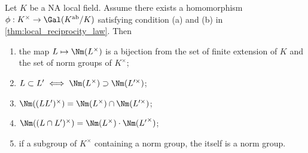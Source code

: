   \begin{corollary}\label{cor:correspondence_between_extensions_and_norm_groups}
      Let $K$ be a NA local field.
      Assume there exists a homomorphism $\phi: K^\times \to \Gal(K^\ab / K)$ satisfying condition (a) and (b) in \cref{thm:local_reciprocity_law}.
      Then
      \begin{enumerate}
          \item the map $L \mapsto \Nm(L^\times)$ is a bijection from the set of finite extension of $K$ and the set of norm groups of $K^\times$;
          \item $L \subset L' \iff \Nm(L^\times) \supset \Nm(L'^\times)$;
          \item $\Nm((LL')^\times) = \Nm(L^\times) \cap \Nm(L'^\times)$;
          \item $\Nm((L \cap L')^\times) = \Nm (L^\times) \cdot \Nm ({L'}^\times)$;
          \item if a subgroup of $K^\times$ containing a norm group, the itself is a norm group.
      \end{enumerate}
  \end{corollary}
